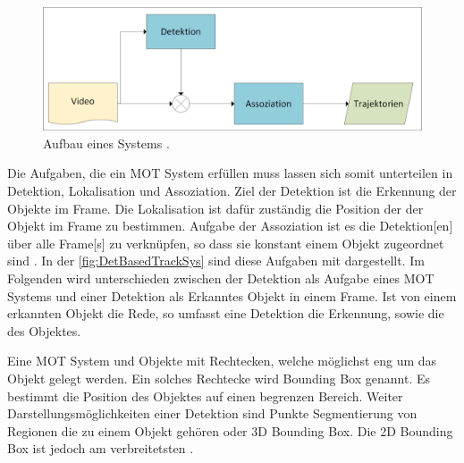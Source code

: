 \begin{figure}[htb]
\centering
\includegraphics[width=1\textwidth]{img/Grafiken/Detektionsbasiertes Tracking.png}
\caption{Aufbau eines  Systems \cite{Luo.2022}.}
\label{fig:DetBasedTrackSys}
\end{figure}


Die Aufgaben, die ein \gls{MOT} System erfüllen muss lassen sich somit unterteilen in \gls{Detektion}, \gls{Lokalisation} und \gls{Assoziation}. Ziel der \gls{Detektion} ist die Erkennung der Objekte im \gls{Frame}. Die \gls{Lokalisation} ist dafür zuständig die Position der der Objekt im \gls{Frame} zu bestimmen. Aufgabe der \gls{Assoziation} ist es die \gls{Detektion}[en] über alle \gls{Frame}[s] zu verknüpfen, so dass sie konstant einem Objekt zugeordnet sind \cite{CLEAR.2008, HOTA}. In der \autoref{fig:DetBasedTrackSys} sind diese Aufgaben mit dargestellt. Im Folgenden wird unterschieden zwischen der \gls{Detektion} als Aufgabe eines \gls{MOT} Systems und einer \gls{Detektion} als Erkanntes Objekt in einem \gls{Frame}. Ist von einem erkannten Objekt die Rede, so umfasst eine \gls{Detektion} die Erkennung, sowie die  des Objektes. \par

Eine \gls{MOT} System  und  Objekte mit Rechtecken, welche möglichst eng um das Objekt gelegt werden. Ein solches Rechtecke wird \gls{Bounding Box} genannt. Es bestimmt die Position des Objektes auf einen begrenzen Bereich. Weiter Darstellungsmöglichkeiten einer \gls{Detektion} sind Punkte Segmentierung von Regionen die zu einem Objekt gehören oder 3D \gls{Bounding Box}. Die 2D \gls{Bounding Box} ist jedoch am verbreitetsten \cite{MOT15, HOTA, Luo.2022}. \par 

